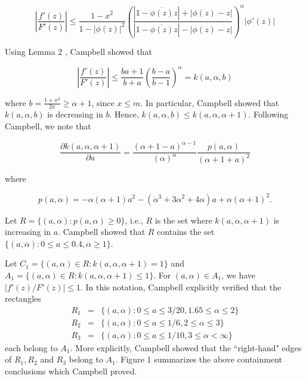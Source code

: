 \documentclass[12pt]{article}
\newcommand{\ds}{\displaystyle}
\begin{document}
\begin{equation} \label{fund}
\left | \frac{f'(z)}{F'(z)}\right | \le \frac{1-x^2}{1-|\phi(z)|^2}
\left( \frac{|1-\overline{\phi(z)}z|+|\phi(z)-z|}{|1-\overline{\phi(z)}z|-|\phi(z)-z|} \right ) ^\alpha
|\phi'(z)|
\end{equation}

Using Lemma 2 \cite{DMC03}, Campbell showed that

\begin{equation} \label{fund-2}
\left | \frac{f'(z)}{F'(z)} \right | \le \frac{ba+1}{b+a} \left ( \frac{b-a}{b-1} \right ) ^ \alpha = k(a,\alpha,b)
\end{equation}

\noindent where ${\ds b = \frac{1+x^2}{2x} \ge \alpha+1}$, since $x \le m$. 
In particular, Campbell showed that $k(a,\alpha,b)$ is decreasing in $b$.  Hence, $k(a,\alpha,b) \le k(a,\alpha,\alpha+1)$. 
Following Campbell, we note that 

$$\frac{\partial k(a,\alpha,\alpha+1)}{\partial a} = \frac{(\alpha+1-a)^{\alpha-1}}{(\alpha)^{\alpha}}\frac{p(a,\alpha)}{(\alpha+1+a)^2}
$$

\noindent where 

\begin{equation} \label{poly_p}
p(a,\alpha) = -\alpha(\alpha+1)a^2 -(\alpha^3+3\alpha^2+4\alpha)a +\alpha(\alpha+1)^2. 
\end{equation}

\noindent Let $R=\{(a,\alpha) : p(a,\alpha) \ge 0 \}$, i.e., $R$ is the set where $k(a,\alpha,\alpha+1)$ is increasing
in $a$.  Campbell showed that $R$ contains the set $\{(a,\alpha) : 0 \le a \le 0.4, \alpha \ge 1 \}$.  

Let $C_1 = \{(a,\alpha) \in R : k(a,\alpha ,\alpha +1) = 1\}$ and $A_1 = \{(a,\alpha) \in R : k(a,\alpha ,\alpha +1) \le 1\}$. 
For $(a,\alpha) \in A_1$, we have $|f'(z)/F'(z)| \le 1$.  In this notation, Campbell explicitly verified that the rectangles
\begin{eqnarray*}
R_1 &=& \{(a,\alpha) : 0 \le a \le 3/20, 1.65 \le \alpha \le 2 \}\\
R_2 &=& \{(a,\alpha) : 0 \le a \le 1/6, 2 \le \alpha \le 3 \}\\ 
R_3 &=& \{(a,\alpha) : 0 \le a \le 1/10, 3 \le \alpha < \infty \}
\end{eqnarray*} 
\noindent each belong to $A_1$. More explicitly, Campbell showed that the ``right-hand" edges of $R_1, R_2$ and $R_3$ belong to $A_1$.  Figure 1 summarizes the above containment conclusions which Campbell proved.
\end{document}
